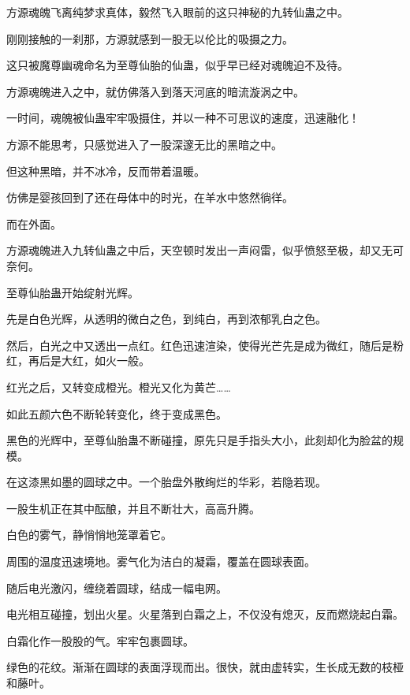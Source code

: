 
\begin{this_body}



方源魂魄飞离纯梦求真体，毅然飞入眼前的这只神秘的九转仙蛊之中。

刚刚接触的一刹那，方源就感到一股无以伦比的吸摄之力。

这只被魔尊幽魂命名为至尊仙胎的仙蛊，似乎早已经对魂魄迫不及待。

方源魂魄进入之中，就仿佛落入到落天河底的暗流漩涡之中。

一时间，魂魄被仙蛊牢牢吸摄住，并以一种不可思议的速度，迅速融化！

方源不能思考，只感觉进入了一股深邃无比的黑暗之中。

但这种黑暗，并不冰冷，反而带着温暖。

仿佛是婴孩回到了还在母体中的时光，在羊水中悠然徜徉。

而在外面。

方源魂魄进入九转仙蛊之中后，天空顿时发出一声闷雷，似乎愤怒至极，却又无可奈何。

至尊仙胎蛊开始绽射光辉。

先是白色光辉，从透明的微白之色，到纯白，再到浓郁乳白之色。

然后，白光之中又透出一点红。红色迅速渲染，使得光芒先是成为微红，随后是粉红，再后是大红，如火一般。

红光之后，又转变成橙光。橙光又化为黄芒……

如此五颜六色不断轮转变化，终于变成黑色。

黑色的光辉中，至尊仙胎蛊不断碰撞，原先只是手指头大小，此刻却化为脸盆的规模。

在这漆黑如墨的圆球之中。一个胎盘外散绚烂的华彩，若隐若现。

一股生机正在其中酝酿，并且不断壮大，高高升腾。

白色的雾气，静悄悄地笼罩着它。

周围的温度迅速境地。雾气化为洁白的凝霜，覆盖在圆球表面。

随后电光激闪，缠绕着圆球，结成一幅电网。

电光相互碰撞，划出火星。火星落到白霜之上，不仅没有熄灭，反而燃烧起白霜。

白霜化作一股股的气。牢牢包裹圆球。

绿色的花纹。渐渐在圆球的表面浮现而出。很快，就由虚转实，生长成无数的枝桠和藤叶。


\end{this_body}
